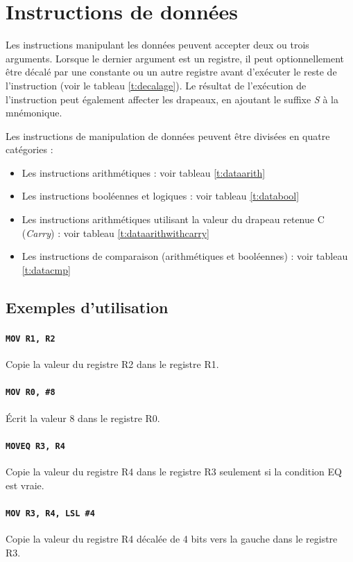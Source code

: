 \documentclass{tufte-handout}
\begin{document}
\clearpage

\section{Instructions de données}

Les instructions manipulant les données peuvent accepter deux ou trois arguments. Lorsque le dernier argument est un registre, il peut optionnellement être décalé par une constante ou un autre registre avant d'exécuter le reste de l'instruction (voir le tableau \ref{t:decalage}). Le résultat de l'exécution de l'instruction peut également affecter les drapeaux, en ajoutant le suffixe \textit{S} à la mnémonique.

Les instructions de manipulation de données peuvent être divisées en quatre catégories :

\begin{itemize}
	\item Les instructions arithmétiques : voir tableau \ref{t:dataarith} 
	\item Les instructions booléennes et logiques : voir tableau \ref{t:databool}
	\item Les instructions arithmétiques utilisant la valeur du drapeau retenue C (\textit{Carry}) : voir tableau \ref{t:dataarithwithcarry}
	\item Les instructions de comparaison (arithmétiques et booléennes) : voir tableau \ref{t:datacmp}
\end{itemize}

\subsection{Exemples d'utilisation}

\paragraph{\texttt{MOV R1, R2}} Copie la valeur du registre R2 dans le registre R1.
\paragraph{\texttt{MOV R0, \#8}} Écrit la valeur 8 dans le registre R0.
\paragraph{\texttt{MOVEQ R3, R4}} Copie la valeur du registre R4 dans le registre R3 seulement si la condition EQ est vraie.
\paragraph{\texttt{MOV R3, R4, LSL \#4}} Copie la valeur du registre R4 décalée de 4 bits vers la gauche dans le registre R3.
\end{document}
